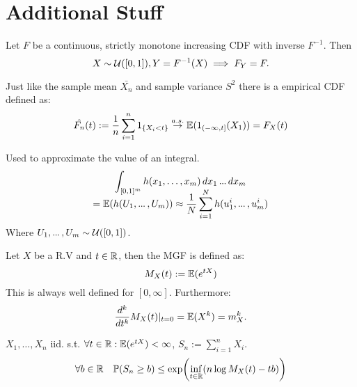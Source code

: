 \section{Additional Stuff}
\begin{theorem*}
  Let \(F\) be a continuous, strictly monotone increasing CDF with inverse \(F^{-1}\). Then
  \[X \sim \operatorname{\mathcal{U}}([0, 1]), Y = F^{-1}(X) \implies F_Y = F.\]

\end{theorem*}

\begin{definition*}
  Just like the sample mean \(\bar{X_n}\) and sample variance \(S^2\) there is a empirical CDF defined as:
  \[\hat{F_n}(t) := \frac{1}{n}\sum_{i=1}^n 1_{\{X_i < t\}} \stackrel{a.s.}{\to} \mathbb{E}(1_{(-\infty, t]}(X_1)) = F_X(t)\]
\end{definition*}

\begin{definition*}
  Used to approximate the value of an integral.
  \begin{multline*}
    \int_{[0, 1]^m} h(x_1, \ldots, x_m) \, dx_1 \sdots dx_m \\[-10pt]
    = \E(h(U_1, \sdots, U_m)) \approx \frac{1}{N} \sum_{i=1}^N h(u_1^i, \sdots, u_m^i)
  \end{multline*}
  Where \(U_1, \sdots, U_m \sim \Unif([0, 1])\).
\end{definition*}

\begin{definition*}
  Let \(X\) be a R.V and \(t \in \mathbb{R}\), then the MGF is defined as:
  \[M_X(t) := \mathbb{E}(e^{tX})\]
  This is always well defined for \([0, \infty]\). Furthermore:
  \[\frac{d^k}{dt^k} M_X(t) |_{t=0} = \mathbb{E}(X^k) = m_X^k.\]
\end{definition*}

\begin{theorem*}
  \(X_1, \ldots, X_n\) iid. s.t. \(\forall t \in \mathbb{R}: \mathbb{E}(e^{tX}) < \infty \), \(S_n := \sum\limits_{i=1}^n X_i\).
  \[\forall b \in \mathbb{R} \quad \mathbb{P}(S_n \geq b) \leq \exp(\underset{t \in \mathbb{R}}{\inf}(n \log M_X(t) - tb))\]
\end{theorem*}
